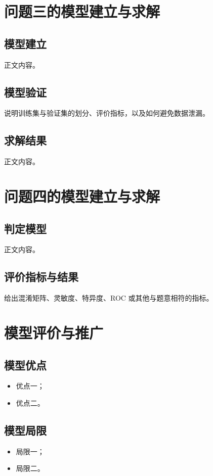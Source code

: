 \documentclass[UTF8,a4paper,12pt,fontset=fandol]{ctexart}
\begin{document}
\section{问题三的模型建立与求解}
\subsection{模型建立}
正文内容。

\subsection{模型验证}
说明训练集与验证集的划分、评价指标，以及如何避免数据泄漏。

\subsection{求解结果}
正文内容。

\section{问题四的模型建立与求解}
\subsection{判定模型}
正文内容。

\subsection{评价指标与结果}
给出混淆矩阵、灵敏度、特异度、ROC 或其他与题意相符的指标。

\section{模型评价与推广}
\subsection{模型优点}
\begin{itemize}
  \item 优点一；
  \item 优点二。
\end{itemize}

\subsection{模型局限}
\begin{itemize}
  \item 局限一；
  \item 局限二。
\end{itemize}
\end{document}
